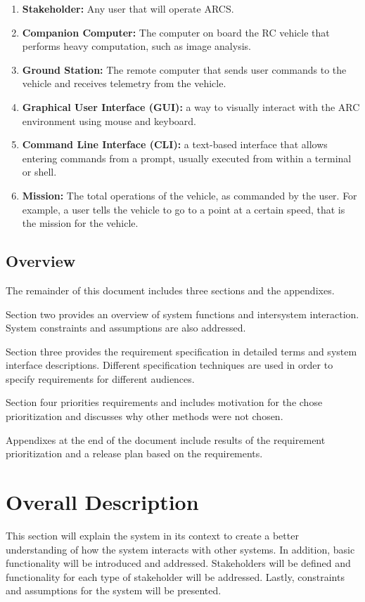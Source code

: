 \documentclass[compsoc,draftclsnofoot,onecolumn,10pt]{IEEEtran}
\begin{document}
\begin{enumerate}
	\item \textbf{Stakeholder:} Any user that will operate ARCS.
	\item \textbf{Companion Computer:} The computer on board the RC vehicle that performs heavy computation, such as image analysis.
	\item \textbf{Ground Station:} The remote computer that sends user commands to the vehicle and receives telemetry from the vehicle.
	\item \textbf{Graphical User Interface (GUI):} a way to visually interact with the ARC environment using mouse and keyboard.
	\item \textbf{Command Line Interface (CLI):} a text-based interface that allows entering commands from a prompt, usually executed from within a terminal or shell.
	\item \textbf{Mission:} The total operations of the vehicle, as commanded by the user. For example, a user tells the vehicle to go to a point at a certain speed, that is the mission for the vehicle.
\end{enumerate}

\subsection{Overview} %
The remainder of this document includes three sections and the appendixes. \par
Section two provides an overview of system functions and intersystem interaction. 
System constraints and assumptions are also addressed. \par
Section three provides the requirement specification in detailed terms and system interface descriptions. 
Different specification techniques are used in order to specify requirements for different audiences. \par
Section four priorities requirements and includes motivation for the chose prioritization and discusses why other methods were not chosen. \par
Appendixes at the end of the document include results of the requirement prioritization and a release plan based on the requirements. \cite{IEEE830}

\section{Overall Description} %
This section will explain the system in its context to create a better understanding of how the system interacts with other systems.
In addition, basic functionality will be introduced and addressed. 
Stakeholders will be defined and functionality for each type of stakeholder will be addressed. 
Lastly, constraints and assumptions for the system will be presented. 
\end{document}
